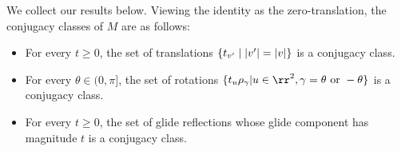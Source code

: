 \documentclass{scrartcl}
\begin{document}
\begin{solution}
        We collect our results below. Viewing the identity as the zero-translation, the conjugacy classes of $M$ are as follows:
        \begin{itemize}
            \item {} For every $t\ge 0$, the set of translations $\{t_{v'}\mid \lvert v'\rvert=\lvert v\rvert\}$ is a conjugacy class.
            \item {} For every $\theta\in (0,\pi]$, the set of rotations $\{t_u\rho_\gamma| u\in \rr^2, \gamma=\theta \text{ or } -\theta\}$ is a conjugacy class.
            \item {} For every $t\ge 0$, the set of glide reflections whose glide component has magnitude $t$ is a conjugacy class.
        \end{itemize}
        \end{solution}

\end{document}
